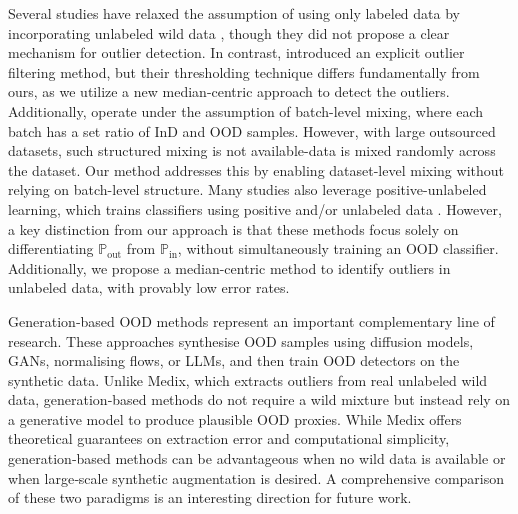 \documentclass[10pt]{article} %
\theoremstyle{plain}
\theoremstyle{definition}
\begin{document}
Several studies \citep{NEURIPS2021_f4334c13, pmlr-v162-katz-samuels22a, he2023topological} have relaxed the assumption of using only labeled data by incorporating unlabeled wild data \citep{pmlr-v162-katz-samuels22a, geng2025lod}, though they did not propose a clear mechanism for outlier detection. In contrast, \citet{du2024how, du2024vlmguard} introduced an explicit outlier filtering method, but their thresholding technique differs fundamentally from ours, as we utilize a new median-centric approach to detect the outliers. Additionally, \citet{pmlr-v162-katz-samuels22a, du2024how} operate under the assumption of batch-level mixing, where each batch has a set ratio of InD and OOD samples. However, with large outsourced datasets, such structured mixing is not available-data is mixed randomly across the dataset. Our method addresses this by enabling dataset-level mixing without relying on batch-level structure. Many studies also leverage positive-unlabeled learning, which trains classifiers using positive and/or unlabeled data \citep{letouzey2000learning, pmlr-v37-hsiehb15, pmlr-v37-plessis15, niu2016theoretical, gong2018margin, NEURIPS2020_1e6e25d9, NEURIPS2021_47b4f1bf, xu2021positive, NEURIPS2022_8d5f526a, zhao2022dist, acharya2022positive}.
However, a key distinction from our approach is that these methods focus solely on differentiating \(\mathbb{P}_{\text{out}}\) from \(\mathbb{P}_{\text{in}}\), without simultaneously training an OOD classifier. Additionally, we propose a median-centric method to identify outliers in unlabeled data, with provably low error rates.

Generation‑based OOD methods \citep{marek2021oodgan, yoon2023diffusion, gao2025good, abbas2025outofdistribution, yoon2025diffusion, lee2025hybood} represent an important complementary line of research. These approaches synthesise OOD samples using diffusion models, GANs, normalising flows, or LLMs, and then train OOD detectors on the synthetic data. Unlike Medix, which extracts outliers from real unlabeled wild data, generation‑based methods do not require a wild mixture but instead rely on a generative model to produce plausible OOD proxies. While Medix offers theoretical guarantees on extraction error and computational simplicity, generation‑based methods can be advantageous when no wild data is available or when large‑scale synthetic augmentation is desired. A comprehensive comparison of these two paradigms is an interesting direction for future work.


\end{document}
